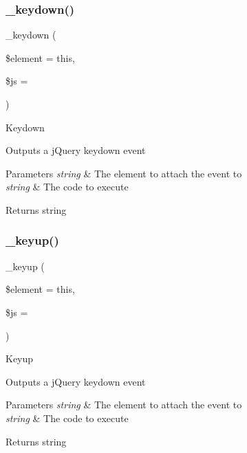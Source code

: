 \subsubsection{\texorpdfstring{\+\_\+keydown()}{\_keydown()}}
{\footnotesize\ttfamily \+\_\+keydown (\begin{DoxyParamCaption}\item[{}]{\$element = {\ttfamily \textquotesingle{}this\textquotesingle{}},  }\item[{}]{\$js = {\ttfamily \textquotesingle{}\textquotesingle{}} }\end{DoxyParamCaption})\hspace{0.3cm}{\ttfamily [protected]}}

Keydown

Outputs a j\+Query keydown event


\begin{DoxyParams}{Parameters}
{\em string} & The element to attach the event to \\
\hline
{\em string} & The code to execute \\
\hline
\end{DoxyParams}
\begin{DoxyReturn}{Returns}
string 
\end{DoxyReturn}
\mbox{\label{class_c_i___jquery_a8671a9d5ea385d65bc6c7ff4b577adfe}} 
\subsubsection{\texorpdfstring{\+\_\+keyup()}{\_keyup()}}
{\footnotesize\ttfamily \+\_\+keyup (\begin{DoxyParamCaption}\item[{}]{\$element = {\ttfamily \textquotesingle{}this\textquotesingle{}},  }\item[{}]{\$js = {\ttfamily \textquotesingle{}\textquotesingle{}} }\end{DoxyParamCaption})\hspace{0.3cm}{\ttfamily [protected]}}

Keyup

Outputs a j\+Query keydown event


\begin{DoxyParams}{Parameters}
{\em string} & The element to attach the event to \\
\hline
{\em string} & The code to execute \\
\hline
\end{DoxyParams}
\begin{DoxyReturn}{Returns}
string 
\end{DoxyReturn}
\mbox{\label{class_c_i___jquery_a24c1ddb2247d180ca74532e991afd4f6}} 
